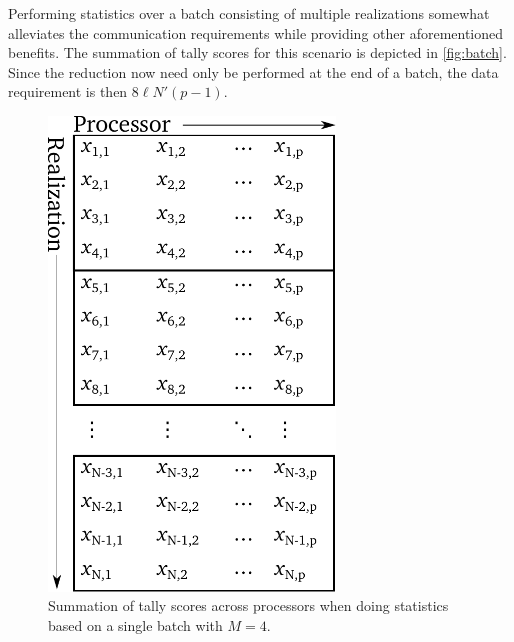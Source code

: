 Performing statistics over a batch consisting of multiple realizations somewhat
alleviates the communication requirements while providing other aforementioned
benefits. The summation of tally scores for this scenario is depicted in
\autoref{fig:batch}. Since the reduction now need only be performed at the end
of a batch, the data requirement is then $8\ell N' (p-1)$.
\begin{figure}[htb]
  \centering
  \includegraphics[width=3in]{figures/ch4/batch.pdf}
  \caption{Summation of tally scores across processors when doing statistics
    based on a single batch with $M=4$.}
  \label{fig:batch}
\end{figure}

